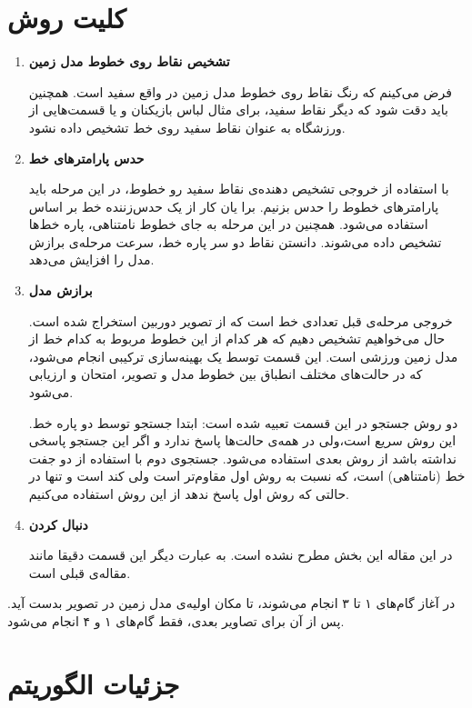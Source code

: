 \documentclass{report}
\begin{document}
\section{کلیت روش}
\begin{enumerate}
\item \textbf{تشخیص نقاط روی خطوط مدل زمین}

فرض می‌کینم که رنگ نقاط روی خطوط مدل زمین در واقع سفید است. همچنین باید دقت شود که دیگر نقاط سفید، برای مثال لباس بازیکنان و یا قسمت‌هایی از ورزشگاه به عنوان نقاط سفید روی خط تشخیص داده نشود.
\item \textbf{حدس پارامترهای خط}

با استفاده از خروجی تشخیص دهنده‌ی نقاط سفید رو خطوط، در این مرحله باید پارامترهای خطوط را حدس بزنیم. برا یان کار از یک حدس‌زننده خط بر اساس  استفاده می‌شود. همچنین در این مرحله به جای خطوط نامتناهی، پاره خط‌ها تشخیص داده می‌شوند. دانستن نقاط دو سر پاره خط، سرعت مرحله‌ی برازش مدل را افزایش می‌دهد.
\item \textbf{برازش مدل}

خروجی مرحله‌ی قبل تعدادی خط است که از تصویر دوربین استخراج شده است. حال می‌خواهیم تشخیص دهیم که هر کدام از این خطوط مربوط به کدام خط از مدل زمین ورزشی است. این قسمت توسط یک بهینه‌سازی ترکیبی انجام می‌شود، که در حالت‌های مختلف انطباق بین خطوط مدل و تصویر، امتحان و ارزیابی می‌شود. 

دو روش جستجو در این قسمت تعبیه شده است: ابتدا جستجو توسط دو پاره خط. این روش سریع است،‌ولی در همه‌ی حالت‌ها پاسخ ندارد و اگر این جستجو پاسخی نداشته باشد از روش بعدی استفاده می‌شود. جستجوی دوم با استفاده از دو جفت خط (نامتناهی) است، که نسبت به روش اول مقاوم‌تر است ولی کند است و تنها در حالتی که روش اول پاسخ ندهد از این روش استفاده می‌کنیم.
\item \textbf{دنبال کردن}

در این مقاله این بخش مطرح نشده است. به عبارت دیگر این قسمت دقیقا مانند مقاله‌ی قبلی\cite{old_paper} است.
\end{enumerate}

در آغاز گام‌های ۱ تا ۳ انجام می‌شوند، تا مکان اولیه‌ی مدل زمین در تصویر بدست آید. پس از آن برای تصاویر بعدی، فقط گام‌های ۱ و ۴ انجام می‌شود.

\section{جزئیات الگوریتم}
\end{document}
